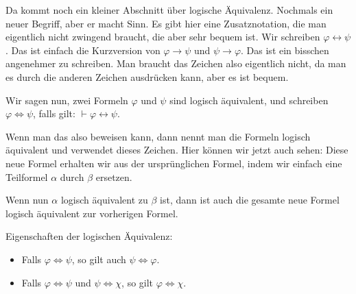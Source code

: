 \begin{spoken-clean}[01:07:47 - 01:09:47]
Da kommt noch ein kleiner Abschnitt über logische Äquivalenz. Nochmals ein neuer Begriff, aber er macht Sinn. Es gibt hier eine Zusatznotation, die man eigentlich nicht zwingend braucht, die aber sehr bequem ist. Wir schreiben $\varphi \leftrightarrow \psi$. Das ist einfach die Kurzversion von $\varphi \to \psi$ und $\psi \to \varphi$. Das ist ein bisschen angenehmer zu schreiben. Man braucht das Zeichen also eigentlich nicht, da man es durch die anderen Zeichen ausdrücken kann, aber es ist bequem.

Wir sagen nun, zwei Formeln $\varphi$ und $\psi$ sind logisch äquivalent, und schreiben $\varphi \Leftrightarrow \psi$, falls gilt: $\vdash \varphi \leftrightarrow \psi$.
\end{spoken-clean}

\begin{math-stroke}
\end{math-stroke}

\begin{spoken-clean}[01:09:47 - 01:11:42]
Wenn man das also beweisen kann, dann nennt man die Formeln logisch äquivalent und verwendet dieses Zeichen. Hier können wir jetzt auch sehen: Diese neue Formel erhalten wir aus der ursprünglichen Formel, indem wir einfach eine Teilformel $\alpha$ durch $\beta$ ersetzen.

Wenn nun $\alpha$ logisch äquivalent zu $\beta$ ist, dann ist auch die gesamte neue Formel logisch äquivalent zur vorherigen Formel.
\end{spoken-clean}

\begin{math-stroke}
Eigenschaften der logischen Äquivalenz:
\begin{itemize}
    \item Falls $\varphi \Leftrightarrow \psi$, so gilt auch $\psi \Leftrightarrow \varphi$.
    \item Falls $\varphi \Leftrightarrow \psi$ und $\psi \Leftrightarrow \chi$, so gilt $\varphi \Leftrightarrow \chi$.
\end{itemize}

\end{math-stroke}

